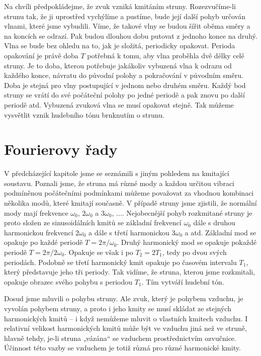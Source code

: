   Na chvíli předpokládejme, že zvuk vzniká kmitáním struny. Rozezvučíme-li strunu tak, že ji 
  uprostřed vychýlíme a pustíme, bude její další pohyb určován vlnami, které jsme vybudili. Víme, 
  že takové vlny se budou šířit oběma směry a na koncích se odrazí. Pak budou dlouhou dobu putovat 
  z jednoho konce na druhý. Vlna se bude bez ohledu na to, jak je složitá, periodicky opakovat. 
  Perioda opakování je právě doba \(T\) potřebná k tomu, aby vlna proběhla dvě délky celé struny. 
  Je to doba, kterou potřebuje jakákoliv vybuzená vlna k odrazu od každého konce, návratu do 
  původní polohy a pokračování v původním směru. Doba je stejná pro vlny postupující v jednom nebo 
  druhém směru. Každý bod struny se vrátí do své počáteční polohy po jedné periodě a pak znovu po 
  další periodě atd. Vybuzená zvuková vlna se musí opakovat stejně. Tak můžeme vysvětlit vznik 
  hudebního tónu brnknutím o strunu.
  
\section{Fourierovy řady}\label{fyz:IchapLsecII}
  V předcházející kapitole jsme se seznámili s jiným pohledem na kmitající soustavu. Poznali jsme, 
  že struna má různé mody a každou určitou vibraci podmíněnou počátečními podmínkami můžeme 
  považovat za vhodnou kombinaci několika modů, které kmitají současně. V případě struny jsme 
  zjistili, že normální mody mají frekvence \(\omega_0\), \(2\omega_0\) a \(3\omega_0\), 
  \(\ldots\). Nejobecnější pohyb rozkmitané struny je proto složen ze sinusoidálních kmitů se 
  základní frekvencí \(\omega_0\) dále s druhou harmonickou frekvencí \(2\omega_0\) a dále s třetí 
  harmonickou \(3\omega_0\) a atd. Základní mod se opakuje po každé periodě \(T=2\pi/\omega_0\). 
  Druhý harmonický mod se opakuje pokaždé periodě \(T=2\pi/2\omega_0\). Opakuje se však i po 
  \(T_2=2T_1\), tedy po dvou svých periodách. Podobně se třetí harmonický kmit opakuje po časovém 
  intervalu \(T_1\), který představuje jeho tři periody. Tak vidíme, že struna, kterou jsme 
  rozkmitali, opakuje obrazec svého pohybu s periodou \(T_1\). Tím vytváří hudební tón. 
  
  Dosud jsme mluvili o pohybu struny. Ale zvuk, který je pohybem vzduchu, je vyvolán pohybem 
  struny, a proto i jeho kmity se musí skládat ze stejných harmonických kmitů – i když nemůžeme 
  mluvit o vlastních kmitech vzduchu. I relativní velikost harmonických kmitů může být ve vzduchu 
  jiná než ve struně, hlavně tehdy, je-li struna „vázána“ se vzduchem prostřednictvím ozvučnice. 
  Účinnost této vazby se vzduchem je totiž různá pro různé harmonické kmity. 
  

